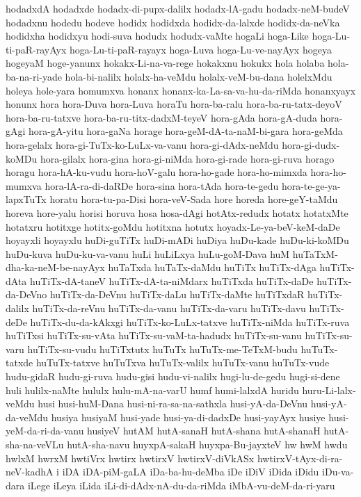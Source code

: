 {hodadxdA
hodadxde
hodadx-di-pupx-dalilx
hodadx-lA-gadu
hodadx-neM-budeV
hodadxnu
hodedu
hodeve
hodidx
hodidxda
hodidx-da-lalxde
hodidx-da-neVka
hodidxha
hodidxyu
hodi-suva
hodudx
hodudx-vaMte
hogaLi
hoga-Like
hoga-Lu-ti-paR-rayAyx
hoga-Lu-ti-paR-rayayx
hoga-Luva
hoga-Lu-ve-nayAyx
hogeya
hogeyaM
hoge-yanunx
hokakx-Li-na-va-rege
hokakxnu
hokukx
hola
holaba
hola-ba-na-ri-yade
hola-bi-nalilx
holalx-ha-veMdu
holalx-veM-bu-dana
holelxMdu
holeya
hole-yara
homumxva
honanx
honanx-ka-La-sa-va-hu-da-riMda
honanxyayx
honunx
hora
hora-Duva
hora-Luva
horaTu
hora-ba-ralu
hora-ba-ru-tatx-deyoV
hora-ba-ru-tatxve
hora-ba-ru-titx-dadxM-teyeV
hora-gAda
hora-gA-duda
hora-gAgi
hora-gA-yitu
hora-gaNa
horage
hora-geM-dA-ta-naM-bi-gara
hora-geMda
hora-gelalx
hora-gi-TuTx-ko-LuLx-va-vanu
hora-gi-dAdx-neMdu
hora-gi-dudx-koMDu
hora-gilalx
hora-gina
hora-gi-niMda
hora-gi-rade
hora-gi-ruva
horago
horagu
hora-hA-ku-vudu
hora-hoV-galu
hora-ho-gade
hora-ho-mimxda
hora-ho-mumxva
hora-lA-ra-di-daRDe
hora-sina
hora-tAda
hora-te-gedu
hora-te-ge-ya-lapxTuTx
horatu
hora-tu-pa-Disi
hora-veV-Sada
hore
horeda
hore-geY-taMdu
horeva
hore-yalu
horisi
horuva
hosa
hosa-dAgi
hotAtx-redudx
hotatx
hotatxMte
hotatxru
hotitxge
hotitx-goMdu
hotitxna
hotutx
hoyadx-Le-ya-beV-keM-daDe
hoyayxli
hoyayxlu
huDi-guTiTx
huDi-mADi
huDiya
huDu-kade
huDu-ki-koMDu
huDu-kuva
huDu-ku-va-vanu
huLi
huLiLxya
huLu-goM-Dava
huM
huTaTxM-dha-ka-neM-be-nayAyx
huTaTxda
huTaTx-daMdu
huTiTx
huTiTx-dAga
huTiTx-dAta
huTiTx-dA-taneV
huTiTx-dA-ta-niMdarx
huTiTxda
huTiTx-daDe
huTiTx-da-DeVno
huTiTx-da-DeVnu
huTiTx-daLu
huTiTx-daMte
huTiTxdaR
huTiTx-dalilx
huTiTx-da-reVnu
huTiTx-da-vanu
huTiTx-da-varu
huTiTx-davu
huTiTx-deDe
huTiTx-du-da-kAkxgi
huTiTx-ko-LuLx-tatxve
huTiTx-niMda
huTiTx-ruva
huTiTxsi
huTiTx-su-vAta
huTiTx-su-vaM-ta-hadudx
huTiTx-su-vanu
huTiTx-su-varu
huTiTx-su-vudu
huTiTxtutx
huTuTx
huTuTx-me-TeTxM-budu
huTuTx-tatxde
huTuTx-tatxve
huTuTxva
huTuTx-valilx
huTuTx-vanu
huTuTx-vude
hudu-gidaR
hudu-gi-ruva
hudu-gisi
hudu-vi-nalilx
hugi-lu-de-gedu
hugi-si-dene
huli
hulilx-naMte
hululx
hulu-mA-na-varU
humf
humi-lalxdA
huridu
huru-Li-lalx-veMdu
husi
husi-huM-Dana
husi-ni-ra-sa-na-sathxla
husi-yA-da-DeVnu
husi-yA-da-veMdu
husiya
husiyaM
husi-yade
husi-ya-di-dadxDe
husi-yayAyx
husiye
husi-yeM-da-ri-da-vanu
husiyeV
hutAM
hutA-sanaH
hutA-shana
hutA-shanaH
hutA-sha-na-veVLu
hutA-sha-navu
huyxpA-sakaH
huyxpa-Bu-jayxteV
hw
hwM
hwdu
hwlxM
hwrxM
hwtiVrx
hwtirx
hwtirxV
hwtirxV-diVkASx
hwtirxV-tAyx-di-ra-neV-kadhA
i
iDA
iDA-piM-gaLA
iDa-ba-hu-deMba
iDe
iDiV
iDida
iDidu
iDu-va-dara
iLege
iLeya
iLida
iLi-di-dAdx-nA-du-da-riMda
iMbA-vu-deM-da-ri-yaru
}
